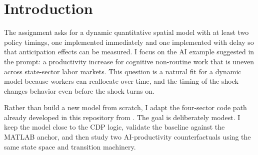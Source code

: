 \section{Introduction}

The assignment asks for a dynamic quantitative spatial model with at least two policy timings,
one implemented immediately and one implemented with delay so that anticipation effects can be
measured. I focus on the AI example suggested in the prompt: a productivity increase for
cognitive non-routine work that is uneven across state-sector labor markets. This question is a
natural fit for a dynamic model because workers can reallocate over time, and the timing of the
shock changes behavior even before the shock turns on.

Rather than build a new model from scratch, I adapt the four-sector code path already developed
in this repository from \citet{caliendo2019trade}. The goal is deliberately modest. I keep the
model close to the CDP logic, validate the baseline against the MATLAB anchor, and then study
two AI-productivity counterfactuals using the same state space and transition machinery.
